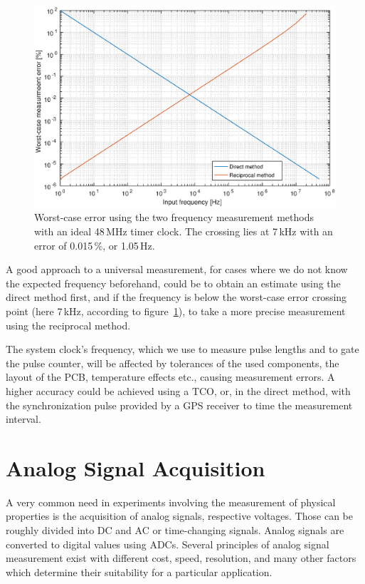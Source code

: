 \begin{figure}[h]
	\centering
	\includegraphics[width=\textwidth] {img/freqmethods.eps}
	\caption[Frequency measurement methods comparison]{\label{fig:freqmethods-graph}Worst-case error using the two frequency measurement methods with an ideal 48\,MHz timer clock. The crossing lies at 7\,kHz with an error of 0.015\,\%, or 1.05\,Hz.}
\end{figure}

A good approach to a universal measurement, for cases where we do not know the expected frequency beforehand, could be to obtain an estimate using the direct method first, and if the frequency is below the worst-case error crossing point (here 7\,kHz, according to figure~\ref{fig:freqmethods-graph}), to take a more precise measurement using the reciprocal method.

The system clock's frequency, which we use to measure pulse lengths and to gate the pulse counter, will be affected by tolerances of the used components, the layout of the \gls{PCB}, temperature effects etc., causing measurement errors. A higher accuracy could be achieved using a \gls{TCO}, or, in the direct method, with the synchronization pulse provided by a \gls{GPS} receiver to time the measurement interval.

\section{Analog Signal Acquisition} \label{sec:theory-adc}

A very common need in experiments involving the measurement of physical properties is the acquisition of analog signals, respective voltages. Those can be roughly divided into \gls{DC} and \gls{AC} or time-changing signals. Analog signals are converted to digital values using \glspl{ADC}. Several principles of analog signal measurement exist with different cost, speed, resolution, and many other factors which determine their suitability for a particular application.

